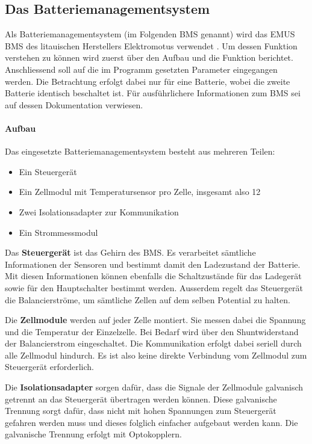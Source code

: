 \subsection{Das Batteriemanagementsystem}

Als Batteriemanagementsystem (im Folgenden BMS genannt) wird das EMUS BMS des litauischen Herstellers Elektromotus verwendet \cite{emus}. Um dessen Funktion verstehen zu können wird zuerst über den Aufbau und die Funktion berichtet. Anschliessend soll auf die im Programm gesetzten Parameter eingegangen werden. Die Betrachtung erfolgt dabei nur für eine Batterie, wobei die zweite Batterie identisch beschaltet ist. Für ausführlichere Informationen zum BMS sei auf dessen Dokumentation \cite{bms} verwiesen.

\paragraph{Aufbau}
Das eingesetzte Batteriemanagementsystem besteht aus mehreren Teilen: \begin{itemize}
	\item Ein Steuergerät
	\item Ein Zellmodul mit Temperatursensor pro Zelle, insgesamt also 12
	\item Zwei Isolationsadapter zur Kommunikation
	\item Ein Strommessmodul
\end{itemize}

Das \textbf{Steuergerät} ist das Gehirn des BMS. Es verarbeitet sämtliche Informationen der Sensoren und bestimmt damit den Ladezustand der Batterie. Mit diesen Informationen können ebenfalls die Schaltzustände für das Ladegerät sowie für den Hauptschalter bestimmt werden. Ausserdem regelt das Steuergerät die Balancierströme, um sämtliche Zellen auf dem selben Potential zu halten.

Die \textbf{Zellmodule} werden auf jeder Zelle montiert. Sie messen dabei die Spannung und die Temperatur der Einzelzelle. Bei Bedarf wird über den Shuntwiderstand der Balancierstrom eingeschaltet. Die Kommunikation erfolgt dabei seriell durch alle Zellmodul hindurch. Es ist also keine direkte Verbindung vom Zellmodul zum Steuergerät erforderlich.

Die \textbf{Isolationsadapter} sorgen dafür, dass die Signale der Zellmodule galvanisch getrennt an das Steuergerät übertragen werden können. Diese galvanische Trennung sorgt dafür, dass nicht mit hohen Spannungen zum Steuergerät gefahren werden muss und dieses folglich einfacher aufgebaut werden kann. Die galvanische Trennung erfolgt mit Optokopplern.

